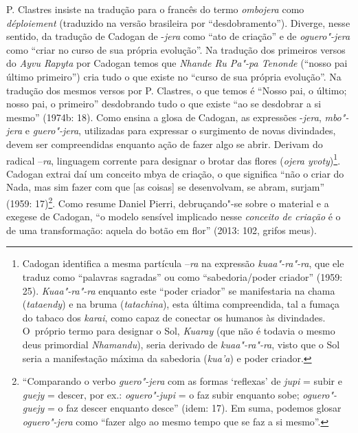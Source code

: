 P. Clastres insiste na tradução para o francês do termo \emph{ombojera} como
\emph{déploiement} (traduzido na versão brasileira por ``desdobramento'').
Diverge, nesse sentido, da tradução de Cadogan de \mbox{-\emph{jera}} como ``ato de
criação'' e de \emph{oguero"-jera} como ``criar no curso de sua própria
evolução''. Na tradução dos primeiros versos do \emph{Ayvu Rapyta} por Cadogan
temos que \emph{Nhande Ru Pa"-pa Tenonde} (``nosso pai último primeiro'') cria
tudo o que existe no ``curso de sua própria evolução''. Na tradução dos
mesmos versos por P. Clastres, o que temos é ``Nosso pai, o último;
nosso pai, o primeiro'' desdobrando tudo o que existe ``ao se desdobrar a
si mesmo'' (1974b: 18). Como ensina a glosa de Cadogan, as expressões
-\emph{jera}, \emph{mbo"-jera} e \emph{guero"-jera}, utilizadas para expressar o surgimento de
novas divindades, devem ser compreendidas enquanto ação de fazer algo
se abrir. Derivam do radical --\emph{ra}, linguagem corrente para designar o
brotar das flores (\emph{ojera yvoty})\footnote{Cadogan identifica a mesma
partícula --\emph{ra} na expressão \emph{kuaa"-ra"-ra}, que ele traduz como ``palavras
sagradas'' ou como ``sabedoria/poder criador'' (1959: 25). \emph{Kuaa"-ra"-ra}
enquanto este ``poder criador'' se manifestaria na chama (\emph{tataendy}) e na
bruma (\emph{tatachina}), esta última compreendida, tal a fumaça do tabaco dos
\emph{karai}, como capaz de conectar os humanos às divindades. O~próprio termo
para designar o Sol, \emph{Kuaray} (que não é todavia o mesmo deus primordial
\emph{Nhamandu}), seria derivado de \emph{kuaa"-ra"-ra}, visto que o Sol seria a
manifestação máxima da sabedoria (\emph{kua’a}) e poder criador.}. Cadogan
extrai daí um conceito mbya de criação, o que significa ``não o criar do
Nada, mas sim fazer com que [as coisas] se desenvolvam, se abram,
surjam'' (1959: 17)\footnote{``Comparando o verbo \emph{guero"-jera} com as
formas ‘reflexas’ de \emph{jupi} = subir e \emph{guejy} = descer, por ex.:
\emph{oguero"-jupi} = o faz subir enquanto sobe; \emph{oguero"-guejy} = o faz descer
enquanto desce'' (idem: 17). Em suma, podemos glosar \emph{oguero"-jera} como
``fazer algo ao mesmo tempo que se faz a si mesmo''.}. Como resume Daniel
Pierri, debruçando"-se sobre o material e a exegese de Cadogan, ``o
modelo sensível implicado nesse \emph{conceito de criação} é o de uma
transformação: aquela do botão em flor'' (2013: 102, grifos meus). 


